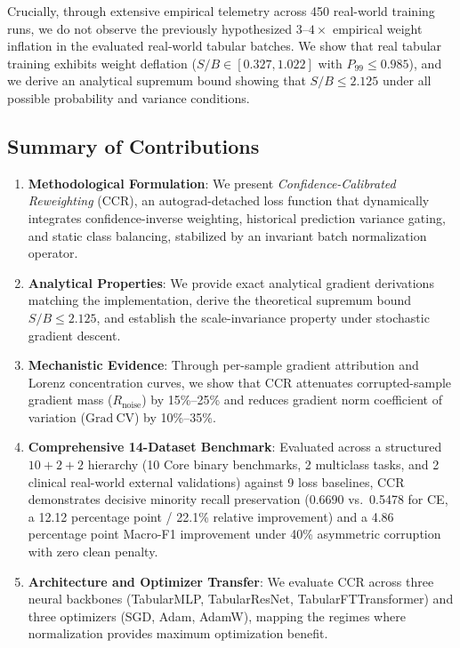 \documentclass[preprint,12pt]{elsarticle}
\begin{document}
Crucially, through extensive empirical telemetry across 450 real-world training runs, we do not observe the previously hypothesized $3\text{--}4\times$ empirical weight inflation in the evaluated real-world tabular batches. We show that real tabular training exhibits weight deflation ($S/B \in [0.327, 1.022]$ with $P_{99} \le 0.985$), and we derive an analytical supremum bound showing that $S/B \le 2.125$ under all possible probability and variance conditions.

\subsection{Summary of Contributions}

\begin{enumerate}
    \item \textbf{Methodological Formulation}: We present \emph{Confidence-Calibrated Reweighting} (CCR), an autograd-detached loss function that dynamically integrates confidence-inverse weighting, historical prediction variance gating, and static class balancing, stabilized by an invariant batch normalization operator.
    \item \textbf{Analytical Properties}: We provide exact analytical gradient derivations matching the implementation, derive the theoretical supremum bound $S/B \le 2.125$, and establish the scale-invariance property under stochastic gradient descent.
    \item \textbf{Mechanistic Evidence}: Through per-sample gradient attribution and Lorenz concentration curves, we show that CCR attenuates corrupted-sample gradient mass ($R_{\mathrm{noise}}$) by 15\%--25\% and reduces gradient norm coefficient of variation ($\mathrm{Grad~CV}$) by 10\%--35\%.
    \item \textbf{Comprehensive 14-Dataset Benchmark}: Evaluated across a structured $10+2+2$ hierarchy (10 Core binary benchmarks, 2 multiclass tasks, and 2 clinical real-world external validations) against 9 loss baselines, CCR demonstrates decisive minority recall preservation (0.6690 vs.\ 0.5478 for CE, a 12.12 percentage point / 22.1\% relative improvement) and a 4.86 percentage point Macro-F1 improvement under 40\% asymmetric corruption with zero clean penalty.
    \item \textbf{Architecture and Optimizer Transfer}: We evaluate CCR across three neural backbones (TabularMLP, TabularResNet, TabularFTTransformer) and three optimizers (SGD, Adam, AdamW), mapping the regimes where normalization provides maximum optimization benefit.
\end{enumerate}
\end{document}
